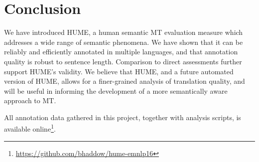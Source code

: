 \documentclass[11pt,letterpaper]{article}
\begin{document}
\section{Conclusion}\label{sec:conclusion}

We have introduced HUME, a human semantic MT evaluation measure which addresses
a wide range of semantic phenomena. We have shown that it can be reliably and 
efficiently annotated in multiple languages,
and that annotation quality is robust to sentence length.
Comparison to direct assessments further support HUME's validity.
We believe that HUME, and a future automated version of HUME,
allows for a finer-grained analysis of translation quality,
and will be useful in informing the development of a more semantically aware
approach to MT.

All annotation data gathered in this project, together with analysis scripts, is available
online\footnote{\url{https://github.com/bhaddow/hume-emnlp16}}.
\end{document}
